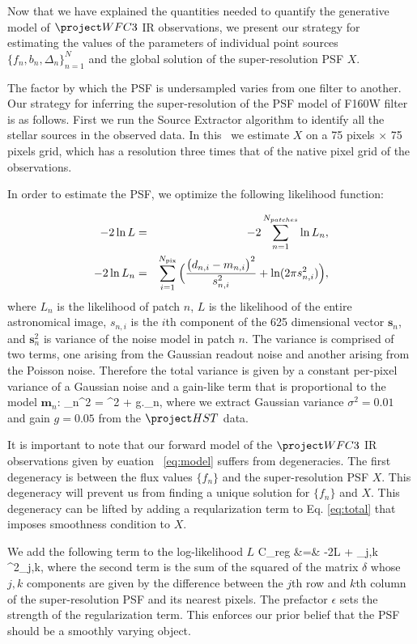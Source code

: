 Now that we have explained the quantities needed to quantify the generative model of $\wfc$ IR observations, we 
present our strategy for estimating the values of the parameters of individual point sources $\{f_{n},b_{n},\Delta_{n}\}_{n=1}^{N}$ and 
the global solution of the super-resolution PSF $X$.

The factor by which the PSF is undersampled varies from one filter to another. Our strategy for inferring the super-resolution of the PSF model of F160W filter is as follows. 
First we run the Source Extractor algorithm to identify all the stellar sources in the observed data. In this \paper\ we estimate $X$ on a 75 pixels $\times$ 75 pixels grid, which 
has a resolution three times that of the native pixel grid of the observations.

In order to estimate the PSF, we optimize the following likelihood function:

\begin{eqnarray}
-2 \ln L &=& -2 \sum_{n=1}^{N_{patches}} \ln L_{n} \label{eq:total} , \\
-2 \ln L_{n} &=& \sum_{i=1}^{N_{\rm pix}} \Big( \frac{\big(d_{n,i} - m_{n,i} \big)^{2}}{s^{2}_{n,i}} + \ln(2 \pi s_{n,i}^{2}) \Big) \label{eq:patch},
\end{eqnarray}
where $L_{n}$ is the likelihood of patch $n$, $L$ is the likelihood of the entire astronomical image, $s_{n,i}$ is the $i$th component of the 625 dimensional vector $\mathbf{s}_n$, and 
$\mathbf{s}_n^{2}$ is variance of the noise model in patch $n$. The variance is comprised of two terms, one arising from the Gaussian readout noise and another arising from the Poisson noise.
Therefore the total variance is given by a constant per-pixel variance of a Gaussian noise and a gain-like term that is proportional to the model $\mathbf{m}_{n}$:
\beq
{}_n^{2} = \sigma^{2} + g._{n},
\eeq
where we extract Gaussian variance $\sigma^{2}=0.01$ and gain $g=0.05$ from the $\hst$ data. 

It is important to note that our forward model of the $\wfc$ IR 
observations given by euation ~\ref{eq:model} suffers from degeneracies. The first degeneracy is between 
the flux values $\{f_n\}$ and the super-resolution PSF $X$. This degeneracy will prevent us from finding a unique 
solution for $\{f_n\}$ and $X$. This degeneracy can be lifted by adding a reqularization term to Eq. \ref{eq:total} that imposes 
smoothness condition to $X$. 

We add the following term to the log-likelihood $L$
\beq
C_{\rm reg} &=& -2\ln L + \epsilon \sum_{j,k} \delta^{2}_{j,k},
\label{eq:reg}
\eeq
where the second term is the sum of the squared of the matrix $\delta$ whose $j,k$ components are given by the difference between the $j$th row and $k$th column of the super-resolution PSF 
and its nearest pixels. The prefactor $\epsilon$ sets the strength of the regularization term. This enforces our prior belief that the PSF should be a smoothly varying object.

